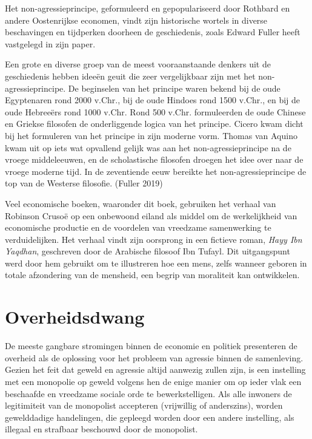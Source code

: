 \documentclass[
  a5paper,
  smalldemyvopaper,11pt,twoside,onecolumn,openright,extrafontsizes,
hidelinks]{memoir}
\begin{document}
Het non-agressieprincipe, geformuleerd en gepopulariseerd door Rothbard
en andere Oostenrijkse economen, vindt zijn historische wortels in
diverse beschavingen en tijdperken doorheen de geschiedenis, zoals
Edward Fuller heeft vastgelegd in zijn paper.

Een grote en diverse groep van de meest vooraanstaande denkers uit de
geschiedenis hebben ideeën geuit die zeer vergelijkbaar zijn met het
non-agressieprincipe. De beginselen van het principe waren bekend bij de
oude Egyptenaren rond 2000 v.Chr., bij de oude Hindoes rond 1500 v.Chr.,
en bij de oude Hebreeërs rond 1000 v.Chr. Rond 500 v.Chr. formuleerden
de oude Chinese en Griekse filosofen de onderliggende logica van het
principe. Cicero kwam dicht bij het formuleren van het principe in zijn
moderne vorm. Thomas van Aquino kwam uit op iets wat opvallend gelijk
was aan het non-agressieprincipe na de vroege middeleeuwen, en de
scholastische filosofen droegen het idee over naar de vroege moderne
tijd. In de zeventiende eeuw bereikte het non-agressieprincipe de top
van de Westerse filosofie. (Fuller 2019)

Veel economische boeken, waaronder dit boek, gebruiken het verhaal van
Robinson Crusoë op een onbewoond eiland als middel om de werkelijkheid
van economische productie en de voordelen van vreedzame samenwerking te
verduidelijken. Het verhaal vindt zijn oorsprong in een fictieve roman,
\emph{Hayy Ibn Yaqdhan}, geschreven door de Arabische filosoof Ibn
Tufayl. Dit uitgangspunt werd door hem gebruikt om te illustreren hoe
een mens, zelfs wanneer geboren in totale afzondering van de mensheid,
een begrip van moraliteit kan ontwikkelen.

\section{Overheidsdwang}\label{overheidsdwang}

De meeste gangbare stromingen binnen de economie en politiek presenteren
de overheid als de oplossing voor het probleem van agressie binnen de
samenleving. Gezien het feit dat geweld en agressie altijd aanwezig
zullen zijn, is een instelling met een monopolie op geweld volgens hen
de enige manier om op ieder vlak een beschaafde en vreedzame sociale
orde te bewerkstelligen. Als alle inwoners de legitimiteit van de
monopolist accepteren (vrijwillig of anderszins), worden gewelddadige
handelingen, die gepleegd worden door een andere instelling, als
illegaal en strafbaar beschouwd door de monopolist.
\end{document}
